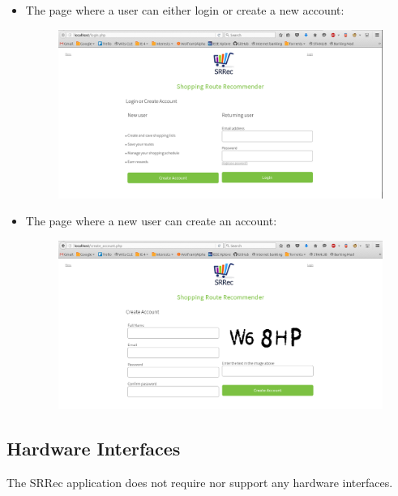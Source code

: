 \documentclass[10pt, a4paper, onecolumn]{scrartcl}
\begin{document}
\begin{itemize}
					\newpage
					\item The page where a user can either login or create a new account:
					\begin{figure}[h!]
						\centering
						\includegraphics[width = \textwidth]{../images/login_new.png}
						\label{login page}
					\end{figure}
					
					
					\item The page where a new user can create an account:
					\begin{figure}[h!]
						\centering
						\includegraphics[width = \textwidth]{../images/create_account_new.png}
						\label{create account page}
					\end{figure}
													
				\end{itemize}
		
		\subsection{Hardware Interfaces}
		
			The SRRec application does not require nor support any hardware interfaces.
		
\end{document}

